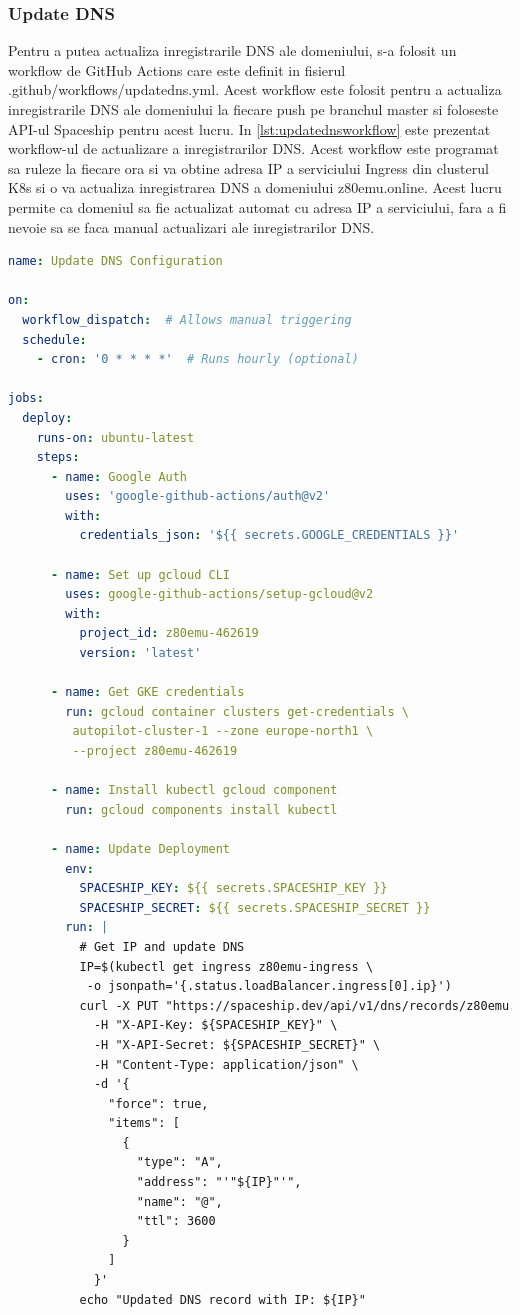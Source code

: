 \documentclass[titlepage,12pt]{article}
\DeclareRobustCommand{\code}[1]{{\ttfamily\small #1}}
\begin{document}
\subsubsection{Update DNS}
Pentru a putea actualiza inregistrarile \ac {DNS} ale domeniului, s-a folosit un workflow de GitHub Actions care este definit in fisierul \code{.github/workflows/updatedns.yml}. Acest workflow este folosit pentru a actualiza inregistrarile \ac {DNS} ale domeniului la fiecare push pe branchul \code{master} si foloseste API-ul Spaceship pentru acest lucru. In \cref{lst:updatednsworkflow} este prezentat workflow-ul de actualizare a inregistrarilor \ac {DNS}. Acest workflow este programat sa ruleze la fiecare ora si va obtine adresa IP a serviciului \code{Ingress} din clusterul \ac {K8s} si o va actualiza inregistrarea \ac {DNS} a domeniului \code{z80emu.online}. Acest lucru permite ca domeniul sa fie actualizat automat cu adresa IP a serviciului, fara a fi nevoie sa se faca manual actualizari ale inregistrarilor \ac {DNS}.

\begin{lstlisting}[language=yaml,caption={Workflow de actualizare a inregistrarilor DNS},label={lst:updatednsworkflow}]
name: Update DNS Configuration

on:
  workflow_dispatch:  # Allows manual triggering
  schedule:
    - cron: '0 * * * *'  # Runs hourly (optional)

jobs:
  deploy:
    runs-on: ubuntu-latest
    steps:
      - name: Google Auth
        uses: 'google-github-actions/auth@v2'
        with:
          credentials_json: '${{ secrets.GOOGLE_CREDENTIALS }}'

      - name: Set up gcloud CLI
        uses: google-github-actions/setup-gcloud@v2
        with:
          project_id: z80emu-462619
          version: 'latest'

      - name: Get GKE credentials
        run: gcloud container clusters get-credentials \
         autopilot-cluster-1 --zone europe-north1 \
         --project z80emu-462619

      - name: Install kubectl gcloud component
        run: gcloud components install kubectl

      - name: Update Deployment
        env:
          SPACESHIP_KEY: ${{ secrets.SPACESHIP_KEY }}
          SPACESHIP_SECRET: ${{ secrets.SPACESHIP_SECRET }}
        run: |
          # Get IP and update DNS
          IP=$(kubectl get ingress z80emu-ingress \
           -o jsonpath='{.status.loadBalancer.ingress[0].ip}')
          curl -X PUT "https://spaceship.dev/api/v1/dns/records/z80emu.online" \
            -H "X-API-Key: ${SPACESHIP_KEY}" \
            -H "X-API-Secret: ${SPACESHIP_SECRET}" \
            -H "Content-Type: application/json" \
            -d '{
              "force": true,
              "items": [
                {
                  "type": "A",
                  "address": "'"${IP}"'",
                  "name": "@",
                  "ttl": 3600
                }
              ]
            }'
          echo "Updated DNS record with IP: ${IP}"
\end{lstlisting}
\end{document}
